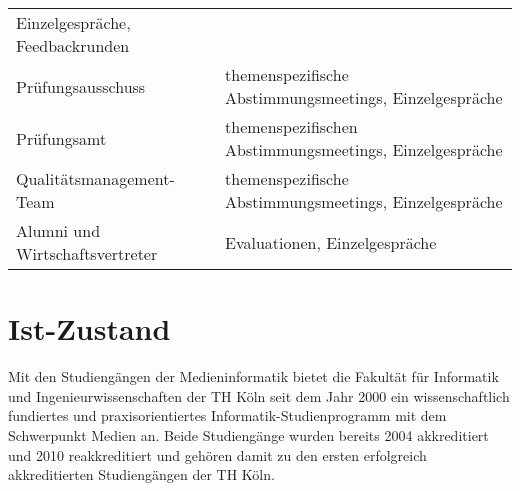 \begin{longtable}[c]{@{}ll@{}}
\begin{minipage}[t]{0.5\columnwidth}\raggedright\strut
Einzelgespräche, Feedbackrunden
\strut\end{minipage}\tabularnewline
\begin{minipage}[t]{0.5\columnwidth}\raggedright\strut
Prüfungsausschuss
\strut\end{minipage} &
\begin{minipage}[t]{0.5\columnwidth}\raggedright\strut
themenspezifische Abstimmungsmeetings, Einzelgespräche
\strut\end{minipage}\tabularnewline
\begin{minipage}[t]{0.5\columnwidth}\raggedright\strut
Prüfungsamt
\strut\end{minipage} &
\begin{minipage}[t]{0.5\columnwidth}\raggedright\strut
themenspezifischen Abstimmungsmeetings, Einzelgespräche
\strut\end{minipage}\tabularnewline
\begin{minipage}[t]{0.5\columnwidth}\raggedright\strut
Qualitätsmanagement-Team
\strut\end{minipage} &
\begin{minipage}[t]{0.5\columnwidth}\raggedright\strut
themenspezifische Abstimmungsmeetings, Einzelgespräche
\strut\end{minipage}\tabularnewline
\begin{minipage}[t]{0.5\columnwidth}\raggedright\strut
Alumni und Wirtschaftsvertreter
\strut\end{minipage} &
\begin{minipage}[t]{0.5\columnwidth}\raggedright\strut
Evaluationen, Einzelgespräche
\strut\end{minipage}\tabularnewline
\bottomrule
\end{longtable}

\chapter{Ist-Zustand\label{/mi-2017/selbstbericht/0100-ist-zustand/0100-ist-zustand}}\label{ist-zustandpathlabelmi-2017selbstbericht0100-ist-zustand0100-ist-zustand}

Mit den Studiengängen der Medieninformatik bietet die Fakultät für
Informatik und Ingenieurwissenschaften der TH Köln seit dem Jahr 2000
ein wissenschaftlich fundiertes und praxisorientiertes
Informatik-Studienprogramm mit dem Schwerpunkt Medien an. Beide
Studiengänge wurden bereits 2004 akkreditiert und 2010 reakkreditiert
und gehören damit zu den ersten erfolgreich akkreditierten Studiengängen
der TH Köln.

